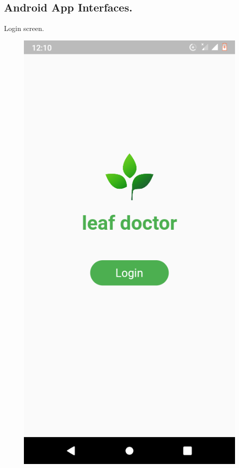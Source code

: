 \documentclass[11pt]{report}
\begin{document}
\newpage
\subsection{Android App Interfaces.}

Login screen.\\
\begin{figure}[h]
	\centerline{\small 
		\includegraphics[height=0.25\textheight]  {login}}
\end{figure}
\end{document}
